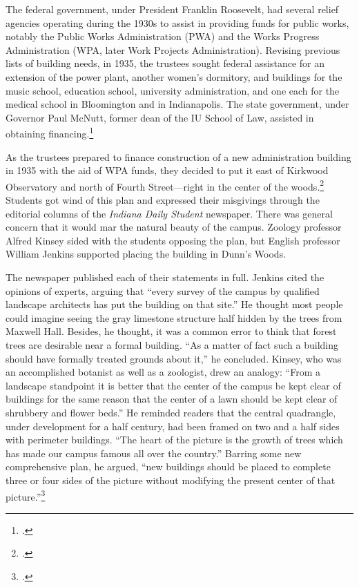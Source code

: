 \documentclass[
  american,
  letterpaper,
]{scrreprt}
\begin{document}
The federal government, under President Franklin Roosevelt, had several
relief agencies operating during the 1930s to assist in providing funds
for public works, notably the Public Works Administration (PWA) and the
Works Progress Administration (WPA, later Work Projects Administration).
Revising previous lists of building needs, in 1935, the trustees sought
federal assistance for an extension of the power plant, another women's
dormitory, and buildings for the music school, education school,
university administration, and one each for the medical school in
Bloomington and in Indianapolis. The state government, under Governor
Paul McNutt, former dean of the IU School of Law, assisted in obtaining
financing.\footnote{.}

As the trustees prepared to finance construction of a new administration
building in 1935 with the aid of WPA funds, they decided to put it east
of Kirkwood Observatory and north of Fourth Street---right in the center
of the woods.\footnote{.}
Students got wind of this plan and expressed their misgivings through
the editorial columns of the \emph{Indiana Daily Student} newspaper.
There was general concern that it would mar the natural beauty of the
campus. Zoology professor Alfred Kinsey sided with the students opposing
the plan, but English professor William Jenkins supported placing the
building in Dunn's Woods.

The newspaper published each of their statements in full. Jenkins cited
the opinions of experts, arguing that ``every survey of the campus by
qualified landscape architects has put the building on that site.'' He
thought most people could imagine seeing the gray limestone structure
half hidden by the trees from Maxwell Hall. Besides, he thought, it was
a common error to think that forest trees are desirable near a formal
building. ``As a matter of fact such a building should have formally
treated grounds about it,'' he concluded. Kinsey, who was an
accomplished botanist as well as a zoologist, drew an analogy: ``From a
landscape standpoint it is better that the center of the campus be kept
clear of buildings for the same reason that the center of a lawn should
be kept clear of shrubbery and flower beds.'' He reminded readers that
the central quadrangle, under development for a half century, had been
framed on two and a half sides with perimeter buildings. ``The heart of
the picture is the growth of trees which has made our campus famous all
over the country.'' Barring some new comprehensive plan, he argued,
``new buildings should be placed to complete three or four sides of the
picture without modifying the present center of that
picture.''\footnote{.}
\end{document}
